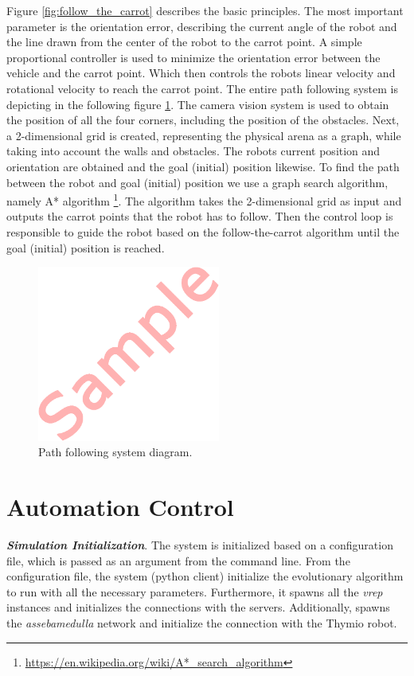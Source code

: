 Figure \ref{fig:follow_the_carrot} describes the basic principles. The most important parameter is the orientation error, describing the current angle of the robot and the line drawn from the center of the robot to the carrot point. A simple proportional controller is used to minimize the orientation error between the vehicle and the carrot point. Which then controls the robots linear velocity and rotational velocity to reach the carrot point. The entire path following system is depicting in the following figure \ref{fig:path_following_diagram}. The camera vision system is used to obtain the position of all the four corners, including the position of the obstacles. Next, a 2-dimensional grid is created, representing the physical arena as a graph, while taking into account the walls and obstacles. The robots current position and orientation are obtained and the goal (initial) position likewise. To find the path between the robot and goal (initial) position we use a graph search algorithm, namely A* algorithm \footnote{\url{https://en.wikipedia.org/wiki/A*_search_algorithm}}. The algorithm takes the 2-dimensional grid as input and outputs the carrot points that the robot has to follow. Then the control loop is responsible to guide the robot based on the follow-the-carrot algorithm until the goal (initial) position is reached.

\begin{figure}[H]
	\centering
  	\includegraphics[width=6cm]{include/images/dummy.PNG}
  	\caption{Path following system diagram.}
  	\label{fig:path_following_diagram}
\end{figure}

\section{Automation Control}

\textbf{\emph{Simulation Initialization}}. The system is initialized based on a configuration file, which is passed as an argument from the command line. From the configuration file, the system (python client) initialize the evolutionary algorithm to run with all the necessary parameters. Furthermore, it spawns all the \emph{vrep} instances and initializes the connections with the servers. Additionally, spawns the \emph{assebamedulla} network and initialize the connection with the Thymio robot.

